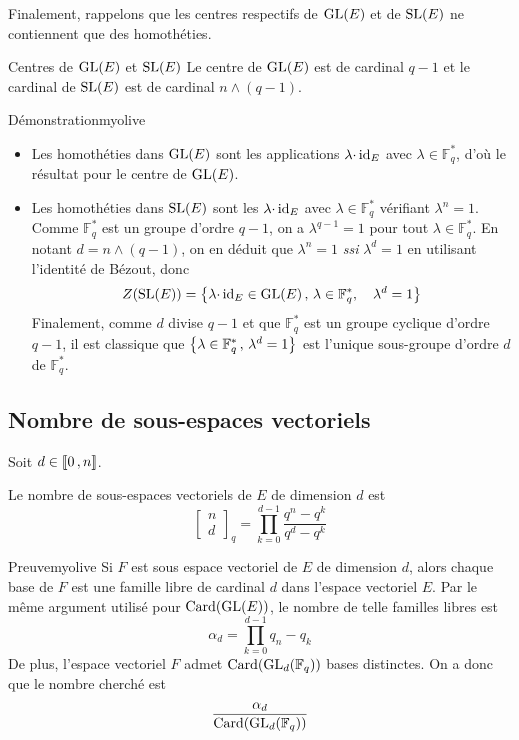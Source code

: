     Finalement, rappelons que les centres respectifs de $\operatorname{GL}(E)$ et de $\operatorname{SL}(E)$ ne contiennent que des homothéties.

    \begin{prop}{Centres de $\operatorname{GL}(E)$ et $\operatorname{SL}(E)$}{}
        Le centre de $\operatorname{GL}(E)$ est de cardinal $q - 1$ et le cardinal de $\operatorname{SL}(E)$ est de cardinal $n \wedge (q-1)$.
    \end{prop}

    \begin{demo}{Démonstration}{myolive}
        \begin{itemize}
            \item Les homothéties dans $\operatorname{GL}(E)$ sont les applications $\lambda\cdotp\operatorname{id}_E$ avec $\lambda \in \mathbb{F}_q^*$, d’où le résultat pour le centre de $\operatorname{GL}(E)$.
            \item Les homothéties dans $\operatorname{SL}(E)$ sont les $\lambda \cdotp \operatorname{id}_E$ avec $\lambda \in \mathbb{F}_q^*$ vérifiant $\lambda^n = 1$. Comme $\mathbb{F}_q^*$ est un groupe d’ordre $q-1$, on a $\lambda^{q-1} = 1$ pour tout $\lambda \in \mathbb{F}^*_q$. En notant $d = n \wedge (q-1)$, on en déduit que $\lambda^n = 1$ \textit{ssi} $\lambda^{d} = 1$ en utilisant l’identité de Bézout, donc 
            \[ Z(\operatorname{SL}(E)) = \left\{ \lambda\cdotp\operatorname{id}_E \in \operatorname{GL}(E) \, , \, \lambda \in \mathbb{F}^*_q, \quad \lambda^d = 1 \right\} \]
            Finalement, comme $d$ divise $q-1$ et que $\mathbb{F}^*_q$ est un groupe cyclique d’ordre $q-1$, il est classique que $\left\{ \lambda \in \mathbb{F}_q^* \, , \, \lambda^d = 1 \right\}$ est l’unique sous-groupe d’ordre $d$ de $\mathbb{F}_q^*$.
        \end{itemize}
    \end{demo}

\subsection{Nombre de sous-espaces vectoriels}

    \begin{prop}{}{}
        Soit $d \in \left\llbracket 0 \, , n \right\rrbracket$.

        Le nombre de sous-espaces vectoriels de $E$ de dimension $d$ est 
        \[ \begin{bmatrix}
            n \\
            d
        \end{bmatrix}_q = \prod_{k=0}^{d-1} \frac{q^n - q^k}{q^d - q^k} \]
    \end{prop}

    \begin{demo}{Preuve}{myolive}
        Si $F$ est sous espace vectoriel de $E$ de dimension $d$, alors chaque base de $F$ est une famille libre de cardinal $d$ dans l’espace vectoriel $E$. Par le même argument utilisé pour $\operatorname{Card}(\operatorname{GL}(E))$, le nombre de telle familles libres est 
        \[ \alpha_d = \prod_{k=0}^{d-1} q_n - q_k \]   
        De plus, l’espace vectoriel $F$ admet $\operatorname{Card}(\operatorname{GL}_d(\mathbb{F}_q))$ bases distinctes. On a donc que le nombre cherché est 
        \[ \frac{\alpha_d}{\operatorname{Card}(\operatorname{GL}_d(\mathbb{F}_q))} \]
    \end{demo}


